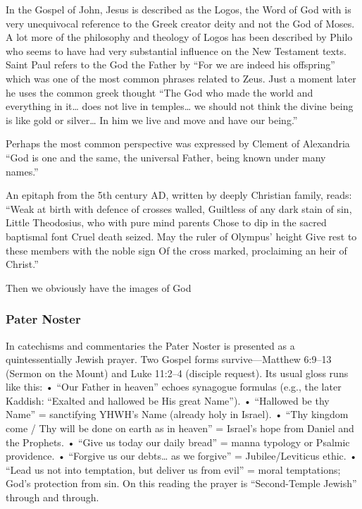 In the Gospel of John, Jesus is described as the Logos, the Word of God with is very unequivocal reference to the Greek creator deity and not the God of Moses.
A lot more of the philosophy and theology of Logos has been described by Philo who seems to have had very substantial influence on the New Testament texts.
Saint Paul refers to the God the Father by ``For we are indeed his offspring'' which was one of the most common phrases related to Zeus.
Just a moment later he uses the common greek thought ``The God who made the world and everything in it\ldots{} does not live in temples\ldots{} we should not think the divine being is like gold or silver\ldots{} In him we live and move and have our being.''

Perhaps the most common perspective was expressed by Clement of Alexandria ``God is one and the same, the universal Father, being known under many names.''

An epitaph from the 5th century AD, written by deeply Christian family, reads: ``Weak at birth with defence of crosses walled, Guiltless of any dark stain of sin, Little Theodosius, who with pure mind parents Chose to dip in the sacred baptismal font Cruel death seized.
May the ruler of Olympus' height Give rest to these members with the noble sign Of the cross marked, proclaiming an heir of Christ.''

Then we obviously have the images of God

\subsubsection{Pater Noster}\label{subsubsec:pater-noster}

In catechisms and commentaries the Pater Noster is presented as a quintessentially Jewish prayer.
Two Gospel forms survive---Matthew 6:9--13 (Sermon on the Mount) and Luke 11:2--4 (disciple request).
Its usual gloss runs like this: • ``Our Father in heaven'' echoes synagogue formulas (e.g., the later Kaddish: ``Exalted and hallowed be His great Name'').
• ``Hallowed be thy Name'' = sanctifying YHWH's Name (already holy in Israel).
• ``Thy kingdom come / Thy will be done on earth as in heaven'' = Israel's hope from Daniel and the Prophets.
• ``Give us today our daily bread'' = manna typology or Psalmic providence.
• ``Forgive us our debts\ldots{} as we forgive'' = Jubilee/Leviticus ethic.
• ``Lead us not into temptation, but deliver us from evil'' = moral temptations; God's protection from sin.
On this reading the prayer is ``Second-Temple Jewish'' through and through.

